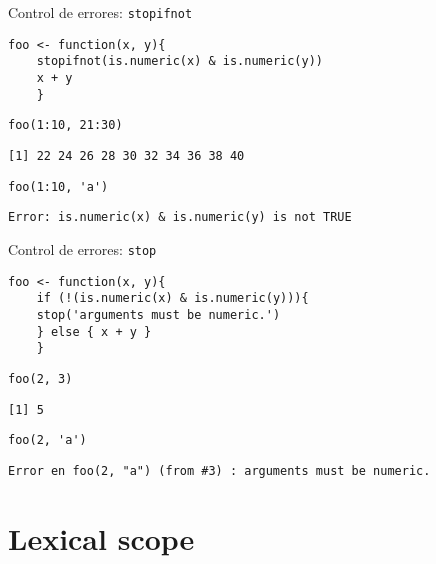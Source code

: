 \documentclass[xcolor={usenames,svgnames,dvipsnames}]{beamer}
\begin{document}
\begin{frame}[fragile,label=sec-1-10]{Control de errores: \texttt{stopifnot}}
 \lstset{language=R,numbers=none}
\begin{lstlisting}
foo <- function(x, y){
    stopifnot(is.numeric(x) & is.numeric(y))
    x + y
    }
\end{lstlisting}

\lstset{language=R,numbers=none}
\begin{lstlisting}
foo(1:10, 21:30)
\end{lstlisting}

\begin{verbatim}
[1] 22 24 26 28 30 32 34 36 38 40
\end{verbatim}

\lstset{language=R,numbers=none}
\begin{lstlisting}
foo(1:10, 'a')
\end{lstlisting}

\begin{verbatim}
Error: is.numeric(x) & is.numeric(y) is not TRUE
\end{verbatim}
\end{frame}
\begin{frame}[fragile,label=sec-1-11]{Control de errores: \texttt{stop}}
 \lstset{language=R,numbers=none}
\begin{lstlisting}
foo <- function(x, y){
    if (!(is.numeric(x) & is.numeric(y))){
	stop('arguments must be numeric.')
	} else { x + y }
    }
\end{lstlisting}

\lstset{language=R,numbers=none}
\begin{lstlisting}
foo(2, 3)
\end{lstlisting}

\begin{verbatim}
[1] 5
\end{verbatim}

\lstset{language=R,numbers=none}
\begin{lstlisting}
foo(2, 'a')
\end{lstlisting}

\begin{verbatim}
Error en foo(2, "a") (from #3) : arguments must be numeric.
\end{verbatim}
\end{frame}
\section{Lexical scope}
\label{sec-2}
\end{document}
